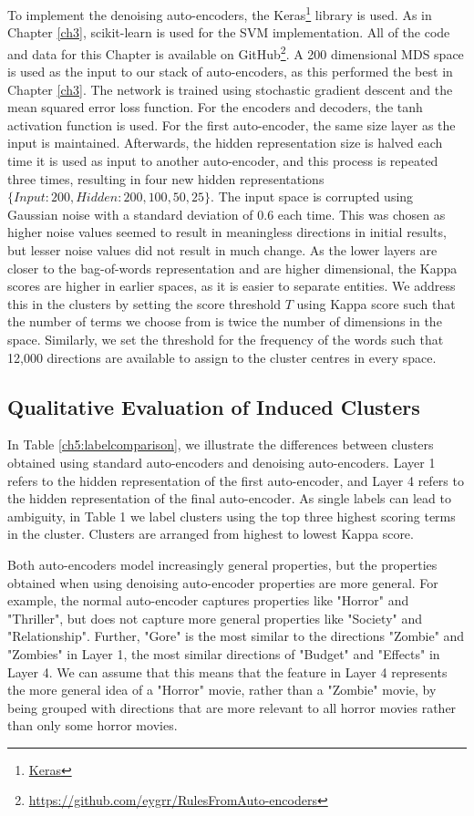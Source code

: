To implement the denoising auto-encoders, the Keras\footnote{\href{https://keras.io/}{Keras}}  library is used. As in Chapter \ref{ch3}, scikit-learn is used for the SVM implementation. All of the code and data for this Chapter is available on GitHub\footnote{\url{https://github.com/eygrr/RulesFromAuto-encoders}}. A 200 dimensional MDS space is used as the input to our stack of auto-encoders, as this performed the best in Chapter \ref{ch3}. The network is trained using stochastic gradient descent and the mean squared error loss function. For the encoders and decoders, the tanh activation function is used. For the first auto-encoder,  the same size layer as the input is maintained. Afterwards, the hidden representation size is halved each time it is used  as input to another auto-encoder, and this process is repeated three times, resulting in four new hidden representations $\{Input: 200, Hidden: 200, 100, 50, 25\}$. The input space is corrupted using  Gaussian noise with a standard deviation of 0.6 each time. This was chosen as higher noise values seemed to result in meaningless directions in initial results, but lesser noise values did not result in much change. As the lower layers are closer to the bag-of-words representation and are higher dimensional, the Kappa scores are higher in earlier spaces, as it is easier to separate entities. We address this in the clusters by setting the  score threshold $T$ using Kappa score  such that the number of terms we choose from is twice the number of dimensions in the space. Similarly, we set the threshold for the frequency of the words such that 12,000 directions are available to assign to the cluster centres in every space. 

\subsection{Qualitative Evaluation of Induced Clusters}

In Table \ref{ch5:labelcomparison}, we illustrate the differences between clusters obtained using standard auto-encoders and denoising auto-encoders. Layer 1 refers to the hidden representation of the first auto-encoder, and Layer 4 refers to the hidden representation of the final auto-encoder. As single labels can lead to ambiguity, in Table 1 we label clusters using the top three highest scoring terms in the cluster. Clusters are arranged from highest to lowest Kappa score. 

Both auto-encoders model increasingly general properties, but the properties obtained when using denoising auto-encoder properties are more general. For example, the normal auto-encoder captures properties like "Horror" and "Thriller", but does not capture more general properties like "Society" and "Relationship". Further, "Gore"  is the  most similar to the directions "Zombie" and "Zombies" in Layer 1, the most similar directions of "Budget" and "Effects" in Layer 4. We can assume that this means that the feature in Layer 4 represents the more general idea of a "Horror" movie, rather than a "Zombie" movie, by being grouped with directions that are more relevant to all horror movies rather than only some horror movies. 

